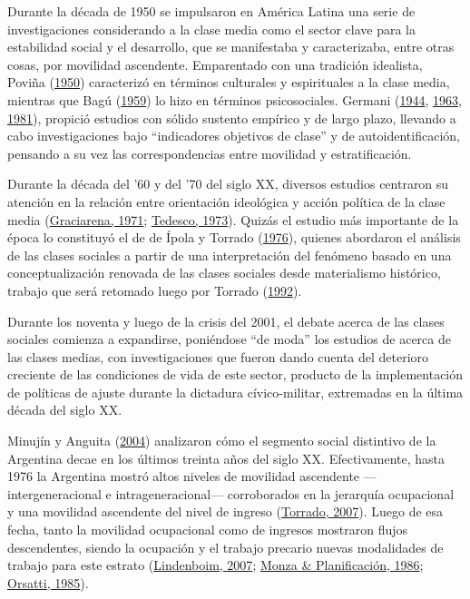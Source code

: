 \documentclass[
]{article}
\begin{document}
Durante la década de 1950 se impulsaron en América Latina una serie de investigaciones considerando a la clase media como el sector clave para la estabilidad social y el desarrollo, que se manifestaba y caracterizaba, entre otras cosas, por movilidad ascendente. Emparentado con una tradición idealista, Poviña (\protect\hyperlink{ref-Povina1950}{1950}) caracterizó en términos culturales y espirituales a la clase media, mientras que Bagú (\protect\hyperlink{ref-Bagu1959}{1959}) lo hizo en términos psicosociales. Germani (\protect\hyperlink{ref-Germani1944}{1944}, \protect\hyperlink{ref-Germani1963}{1963}, \protect\hyperlink{ref-Germani1981}{1981}), propició estudios con sólido sustento empírico y de largo plazo, llevando a cabo investigaciones bajo ``indicadores objetivos de clase'' y de autoidentificación, pensando a su vez las correspondencias entre movilidad y estratificación.

Durante la década del '60 y del '70 del siglo XX, diversos estudios centraron su atención en la relación entre orientación ideológica y acción política de la clase media (\protect\hyperlink{ref-Graciarena1971}{Graciarena, 1971}; \protect\hyperlink{ref-Tedesco1973}{Tedesco, 1973}). Quizás el estudio más importante de la época lo constituyó el de de Ípola y Torrado (\protect\hyperlink{ref-Ipola1976}{1976}), quienes abordaron el análisis de las clases sociales a partir de una interpretación del fenómeno basado en una conceptualización renovada de las clases sociales desde materialismo histórico, trabajo que será retomado luego por Torrado (\protect\hyperlink{ref-Torrado1992}{1992}).

Durante los noventa y luego de la crisis del 2001, el debate acerca de las clases sociales comienza a expandirse, poniéndose ``de moda'' los estudios de acerca de las clases medias, con investigaciones que fueron dando cuenta del deterioro creciente de las condiciones de vida de este sector, producto de la implementación de políticas de ajuste durante la dictadura cívico-militar, extremadas en la última década del siglo XX.

Minujín y Anguita (\protect\hyperlink{ref-Minujin2004}{2004}) analizaron cómo el segmento social distintivo de la Argentina decae en los últimos treinta años del siglo XX. Efectivamente, hasta 1976 la Argentina mostró altos niveles de movilidad ascendente ---intergeneracional e intrageneracional--- corroborados en la jerarquía ocupacional y una movilidad ascendente del nivel de ingreso (\protect\hyperlink{ref-Torrado2007}{Torrado, 2007}). Luego de esa fecha, tanto la movilidad ocupacional como de ingresos mostraron flujos descendentes, siendo la ocupación y el trabajo precario nuevas modalidades de trabajo para este estrato (\protect\hyperlink{ref-Lindenboim2007}{Lindenboim, 2007}; \protect\hyperlink{ref-Monza1986}{Monza \& Planificación, 1986}; \protect\hyperlink{ref-Orsatti1985}{Orsatti, 1985}).
\end{document}
